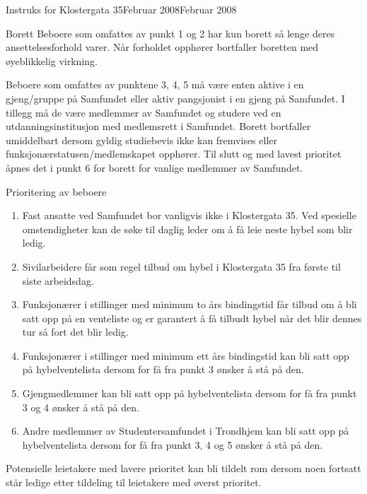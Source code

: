\documentclass[fsbok.tex]{subfiles}
\begin{document}
\begin{instruks}{Instruks for Klostergata 35}{Februar 2008}{Februar 2008}
\begin{instruksledd}{Borett}
        Beboere som omfattes av punkt 1 og 2 har kun borett så lenge deres
        ansettelsesforhold varer. Når forholdet opphører
        bortfaller boretten med øyeblikkelig virkning.
        
        Beboere som omfattes av punktene 3, 4, 5 må være enten aktive i en gjeng/gruppe på
        Samfundet eller aktiv
        pangsjonist i en gjeng på Samfundet. I tillegg må de være medlemmer av Samfundet
        og studere ved en
        utdanningsinstitusjon med medlemsrett i Samfundet. Borett bortfaller umiddelbart
        dersom gyldig studiebevis ikke kan
        fremvises eller funksjonærstatusen/medlemskapet opphører. Til slutt og med lavest
        prioritet åpnes det i punkt 6 for
        borett for vanlige medlemmer av Samfundet.
    \end{instruksledd}

    \begin{instruksledd}{Prioritering av beboere}
        \begin{enumerate}
            \item Fast ansatte ved Samfundet bor vanligvis ikke i Klostergata 35. Ved spesielle
                omstendigheter kan de
                søke til daglig leder om å få leie neste hybel som blir ledig.
            \item Sivilarbeidere får som regel tilbud om hybel i Klostergata 35 fra første til
                siste arbeidsdag.
            \item  Funksjonærer i stillinger med minimum to års bindingstid får tilbud om å bli
                satt opp på en venteliste og
                er garantert å få tilbudt hybel når det blir dennes tur så fort det blir ledig.
            \item Funksjonærer i stillinger med minimum ett års bindingstid kan bli satt opp på
                hybelventelista dersom for
                få fra punkt 3 ønsker å stå på den.
            \item Gjengmedlemmer kan bli satt opp på hybelventelista dersom for få fra punkt 3 og 4
                ønsker å stå på den.
            \item Andre medlemmer av Studentersamfundet i Trondhjem kan bli satt opp på
                hybelventelista dersom for få fra punkt 3, 4 og 5 ønsker å stå på den.
        \end{enumerate}

        Potensielle leietakere med lavere prioritet kan bli tildelt rom dersom noen
        fortsatt står ledige etter tildeling til
        leietakere med øverst prioritet.
    \end{instruksledd}


\end{instruks}
\end{document}
